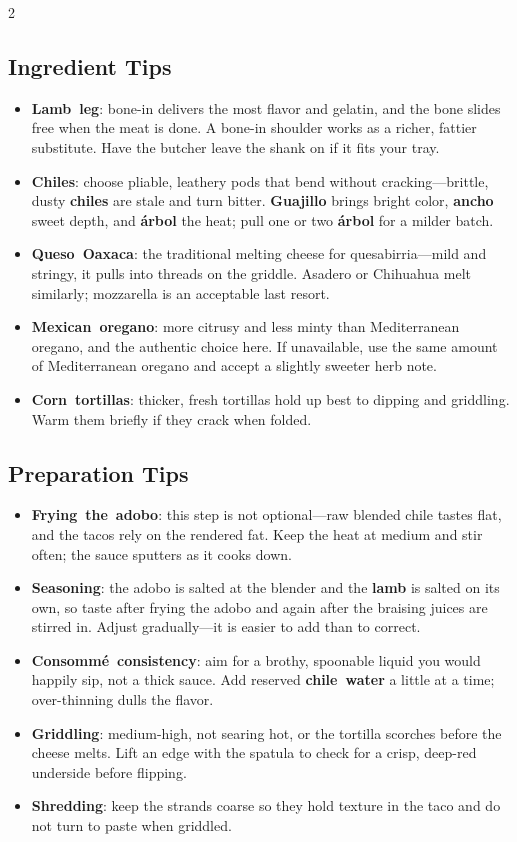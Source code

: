 \documentclass[11pt,letterpaper]{article}
\begin{document}
{\begin{multicols}{2}
\subsection*{Ingredient Tips}
\begin{itemize}
    \item \textbf{Lamb~leg}: bone-in delivers the most flavor and gelatin, and the bone slides free when the meat is done. A bone-in shoulder works as a richer, fattier substitute. Have the butcher leave the shank on if it fits your tray.
    \item \textbf{Chiles}: choose pliable, leathery pods that bend without cracking---brittle, dusty \textbf{chiles} are stale and turn bitter. \textbf{Guajillo} brings bright color, \textbf{ancho} sweet depth, and \textbf{árbol} the heat; pull one or two \textbf{árbol} for a milder batch.
    \item \textbf{Queso~Oaxaca}: the traditional melting cheese for quesabirria---mild and stringy, it pulls into threads on the griddle. Asadero or Chihuahua melt similarly; mozzarella is an acceptable last resort.
    \item \textbf{Mexican~oregano}: more citrusy and less minty than Mediterranean oregano, and the authentic choice here. If unavailable, use the same amount of Mediterranean oregano and accept a slightly sweeter herb note.
    \item \textbf{Corn~tortillas}: thicker, fresh tortillas hold up best to dipping and griddling. Warm them briefly if they crack when folded.
\end{itemize}

\subsection*{Preparation Tips}
\begin{itemize}
    \item \textbf{Frying~the~adobo}: this step is not optional---raw blended chile tastes flat, and the tacos rely on the rendered fat. Keep the heat at medium and stir often; the sauce sputters as it cooks down.
    \item \textbf{Seasoning}: the adobo is salted at the blender and the \textbf{lamb} is salted on its own, so taste after frying the adobo and again after the braising juices are stirred in. Adjust gradually---it is easier to add than to correct.
    \item \textbf{Consommé~consistency}: aim for a brothy, spoonable liquid you would happily sip, not a thick sauce. Add reserved \textbf{chile~water} a little at a time; over-thinning dulls the flavor.
    \item \textbf{Griddling}: medium-high, not searing hot, or the tortilla scorches before the cheese melts. Lift an edge with the spatula to check for a crisp, deep-red underside before flipping.
    \item \textbf{Shredding}: keep the strands coarse so they hold texture in the taco and do not turn to paste when griddled.
\end{itemize}


\end{multicols}}
\end{document}

